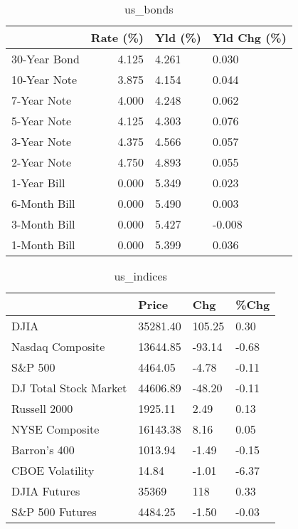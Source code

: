 \documentclass{article}%
\begin{document}
%


\begin{table}[htbp]%
\caption{us\_bonds}%
\centering%
\begin{adjustbox}{width=1\textwidth}%
\begin{tabular}{lrll}
\toprule
             &  Rate (\%) & Yld (\%) & Yld Chg (\%) \\
\midrule
30-Year Bond &     4.125 &   4.261 &       0.030 \\
10-Year Note &     3.875 &   4.154 &       0.044 \\
 7-Year Note &     4.000 &   4.248 &       0.062 \\
 5-Year Note &     4.125 &   4.303 &       0.076 \\
 3-Year Note &     4.375 &   4.566 &       0.057 \\
 2-Year Note &     4.750 &   4.893 &       0.055 \\
 1-Year Bill &     0.000 &   5.349 &       0.023 \\
6-Month Bill &     0.000 &   5.490 &       0.003 \\
3-Month Bill &     0.000 &   5.427 &      -0.008 \\
1-Month Bill &     0.000 &   5.399 &       0.036 \\
\bottomrule
\end{tabular}
%
\end{adjustbox}%
\end{table}

%


\begin{table}[htbp]%
\caption{us\_indices}%
\centering%
\begin{adjustbox}{width=1\textwidth}%
\begin{tabular}{llll}
\toprule
                      &    Price &    Chg &  \%Chg \\
\midrule
                 DJIA & 35281.40 & 105.25 &  0.30 \\
     Nasdaq Composite & 13644.85 & -93.14 & -0.68 \\
              S\&P 500 &  4464.05 &  -4.78 & -0.11 \\
DJ Total Stock Market & 44606.89 & -48.20 & -0.11 \\
         Russell 2000 &  1925.11 &   2.49 &  0.13 \\
       NYSE Composite & 16143.38 &   8.16 &  0.05 \\
         Barron's 400 &  1013.94 &  -1.49 & -0.15 \\
      CBOE Volatility &    14.84 &  -1.01 & -6.37 \\
         DJIA Futures &    35369 &    118 &  0.33 \\
      S\&P 500 Futures &  4484.25 &  -1.50 & -0.03 \\
\bottomrule
\end{tabular}
%
\end{adjustbox}%
\end{table}
\end{document}
